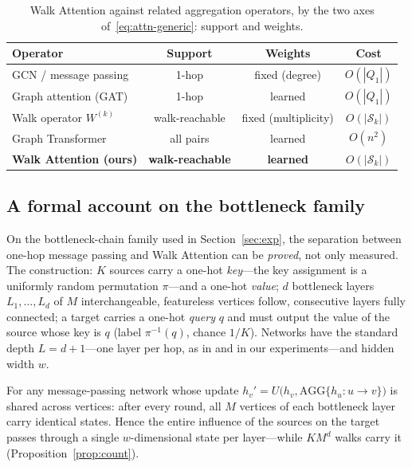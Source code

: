 \documentclass[runningheads]{llncs}
\begin{document}
\begin{table}[t]
\centering
\caption{Walk Attention against related aggregation operators, by the two axes
of~\eqref{eq:attn-generic}: support and weights.}
\label{tab:relation}
\begin{tabular}{lccc}
\toprule
\textbf{Operator} & \textbf{Support} & \textbf{Weights} & \textbf{Cost} \\
\midrule
GCN / message passing       & 1-hop      & fixed (degree) & $O(|Q_1|)$ \\
Graph attention (GAT)       & 1-hop      & learned        & $O(|Q_1|)$ \\
Walk operator $W^{(k)}$     & walk-reachable & fixed (multiplicity) & $O(|\mathcal{S}_k|)$ \\
Graph Transformer           & all pairs  & learned        & $O(n^2)$ \\
\textbf{Walk Attention (ours)} & \textbf{walk-reachable} & \textbf{learned} & $O(|\mathcal{S}_k|)$ \\
\bottomrule
\end{tabular}
\end{table}

\subsection{A formal account on the bottleneck family}\label{sec:theory}

On the bottleneck-chain family used in Section~\ref{sec:exp}, the separation
between one-hop message passing and Walk Attention can be \emph{proved}, not
only measured. The construction: $K$ sources carry a one-hot \emph{key}---the
key assignment is a uniformly random permutation $\pi$---and a one-hot
\emph{value}; $d$ bottleneck layers $L_1,\dots,L_d$ of $M$ interchangeable,
featureless vertices follow, consecutive layers fully connected; a target
carries a one-hot \emph{query} $q$ and must output the value of the source
whose key is $q$ (label $\pi^{-1}(q)$, chance $1/K$). Networks have the
standard depth $L=d+1$---one layer per hop, as in \cite{alon2021bottleneck} and
in our experiments---and hidden width $w$.

\begin{proposition}\label{prop:collapse}
For any message-passing network whose update
$h_v'=U\bigl(h_v,\mathrm{AGG}\{h_u:u\to v\}\bigr)$ is shared across vertices:
after every round, all $M$ vertices of each bottleneck layer carry identical
states. Hence the entire influence of the sources on the target passes through
a single $w$-dimensional state per layer---while $K M^{d}$ walks carry it
(Proposition~\ref{prop:count}).
\end{proposition}
\end{document}
